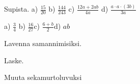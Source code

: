 \begin{tehtavasivu}
\begin{tehtava}
Supista. \quad
a) $\frac{15}{20}$ \qquad b) $\frac{144}{243}$ \qquad c) $\frac{12a+2ab}{4a}$ \qquad d) $\frac{a\cdot a\cdot (3b)}{3a}$
\begin{vastaus}
a) $\frac{3}{4}$ \qquad b) $\frac{16}{27}$\qquad c) $\frac{6+b}{2}$\qquad d) $ab$
\end{vastaus}
\end{tehtava}


\begin{tehtava}
Lavenna samannimisiksi.
\begin{alakohdat}
\end{alakohdat}
\begin{vastaus}
\begin{alakohdat}
\end{alakohdat}
\end{vastaus}
\end{tehtava}

\begin{tehtava}
Laske.
	\begin{alakohdat}
	\end{alakohdat}
	\begin{vastaus}
		\begin{alakohdat}
			\alakohta{$\frac{8}{11}$}
			\alakohta{$\frac{3}{5}$}
			\alakohta{$\frac{7}{6}$}
			\alakohta{$\frac{19}{12}$}
		\end{alakohdat}
	\end{vastaus}
\end{tehtava}

\begin{tehtava}
Muuta sekamurtoluvuksi 
\begin{alakohdatrivi}
\end{alakohdatrivi}
\begin{vastaus}
\begin{alakohdat}
\end{alakohdat}
\end{vastaus}
\end{tehtava}


\end{tehtavasivu}
